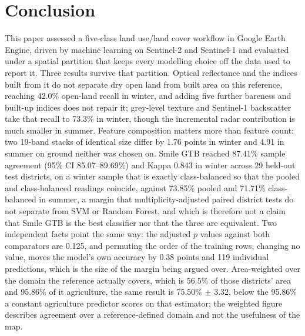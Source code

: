 \documentclass[conference]{IEEEtran}
\begin{document}
\section{Conclusion}
This paper assessed a five-class land use/land cover workflow in Google Earth Engine, driven by machine learning on Sentinel-2 and Sentinel-1 and evaluated under a spatial partition that keeps every modelling choice off the data used to report it. Three results survive that partition. Optical reflectance and the indices built from it do not separate dry open land from built area on this reference, reaching 42.0\% open-land recall in winter, and adding five further bareness and built-up indices does not repair it; grey-level texture and Sentinel-1 backscatter take that recall to 73.3\% in winter, though the incremental radar contribution is much smaller in summer. Feature composition matters more than feature count: two 19-band stacks of identical size differ by 1.76 points in winter and 4.91 in summer on ground neither was chosen on. Smile GTB reached 87.41\% sample agreement (95\% CI 85.07--89.69\%) and Kappa 0.843 in winter across 29 held-out test districts, on a winter sample that is exactly class-balanced so that the pooled and class-balanced readings coincide, against 73.85\% pooled and 71.71\% class-balanced in summer, a margin that multiplicity-adjusted paired district tests do not separate from SVM or Random Forest, and which is therefore not a claim that Smile GTB is the best classifier nor that the three are equivalent. Two independent facts point the same way: the adjusted $p$ values against both comparators are 0.125, and permuting the order of the training rows, changing no value, moves the model's own accuracy by 0.38 points and 119 individual predictions, which is the size of the margin being argued over. Area-weighted over the domain the reference actually covers, which is 56.5\% of those districts' area and 95.86\% of it agriculture, the same result is 75.50\% $\pm$ 3.32, below the 95.86\% a constant agriculture predictor scores on that estimator; the weighted figure describes agreement over a reference-defined domain and not the usefulness of the map.
\end{document}
